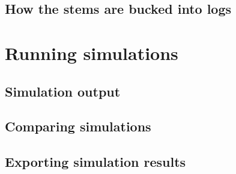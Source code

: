 \documentclass[a4paper,12pt]{report}
\begin{document}
\subsection{How the stems are bucked into logs}

\section{Running simulations}

\subsection{Simulation output}

\subsection{Comparing simulations}

\subsection{Exporting simulation results}
\end{document}
